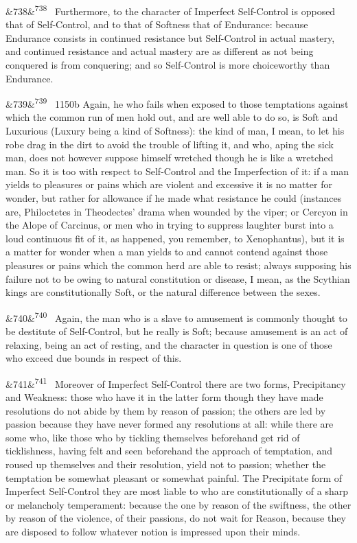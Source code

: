 \documentclass[12pt]{article}
\newcommand{\para}[1][]{\par\noindent\ifx&#1&\else\textsuperscript{\footnotesize #1}~\fi}
\begin{document}
\para[738] Furthermore, to the character of Imperfect Self-Control is opposed that of Self-Control, and to that of Softness that of Endurance: because Endurance consists in continued resistance but Self-Control in actual mastery, and continued resistance and actual mastery are as different as not being conquered is from conquering; and so Self-Control is more choiceworthy than Endurance.

\para[739] 1150b Again, he who fails when exposed to those temptations against which the common run of men hold out, and are well able to do so, is Soft and Luxurious (Luxury being a kind of Softness): the kind of man, I mean, to let his robe drag in the dirt to avoid the trouble of lifting it, and who, aping the sick man, does not however suppose himself wretched though he is like a wretched man. So it is too with respect to Self-Control and the Imperfection of it: if a man yields to pleasures or pains which are violent and excessive it is no matter for wonder, but rather for allowance if he made what resistance he could (instances are, Philoctetes in Theodectes' drama when wounded by the viper; or Cercyon in the Alope of Carcinus, or men who in trying to suppress laughter burst into a loud continuous fit of it, as happened, you remember, to Xenophantus), but it is a matter for wonder when a man yields to and cannot contend against those pleasures or pains which the common herd are able to resist; always supposing his failure not to be owing to natural constitution or disease, I mean, as the Scythian kings are constitutionally Soft, or the natural difference between the sexes.

\para[740] Again, the man who is a slave to amusement is commonly thought to be destitute of Self-Control, but he really is Soft; because amusement is an act of relaxing, being an act of resting, and the character in question is one of those who exceed due bounds in respect of this.

\para[741] Moreover of Imperfect Self-Control there are two forms, Precipitancy and Weakness: those who have it in the latter form though they have made resolutions do not abide by them by reason of passion; the others are led by passion because they have never formed any resolutions at all: while there are some who, like those who by tickling themselves beforehand get rid of ticklishness, having felt and seen beforehand the approach of temptation, and roused up themselves and their resolution, yield not to passion; whether the temptation be somewhat pleasant or somewhat painful. The Precipitate form of Imperfect Self-Control they are most liable to who are constitutionally of a sharp or melancholy temperament: because the one by reason of the swiftness, the other by reason of the violence, of their passions, do not wait for Reason, because they are disposed to follow whatever notion is impressed upon their minds.
\end{document}
